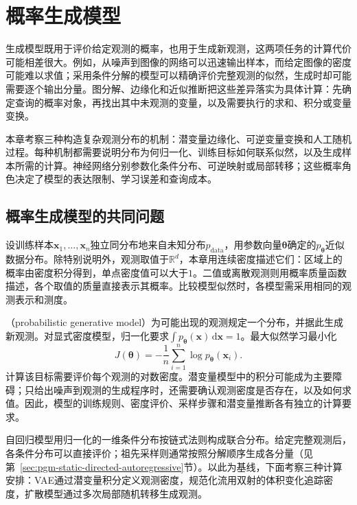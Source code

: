 \chapter{概率生成模型}
\label{chap:pgm-generative}

生成模型既用于评价给定观测的概率，也用于生成新观测，这两项任务的计算代价可能相差很大。例如，从噪声到图像的网络可以迅速输出样本，而给定图像的密度可能难以求值；采用条件分解的模型可以精确评价完整观测的似然，生成时却可能需要逐个输出分量。图分解、边缘化和近似推断把这些差异落实为具体计算：先确定查询的概率对象，再找出其中未观测的变量，以及需要执行的求和、积分或变量变换。

本章考察三种构造复杂观测分布的机制：潜变量边缘化、可逆变量变换和人工随机过程。每种机制都需要说明分布为何归一化、训练目标如何联系似然，以及生成样本所需的计算。神经网络分别参数化条件分布、可逆映射或局部转移；这些概率角色决定了模型的表达限制、学习误差和查询成本。

\section{概率生成模型的共同问题}
\label{sec:pgm-generative-common}

设训练样本$\bm{x}_1,\ldots,\bm{x}_n$独立同分布地来自未知分布$p_{\mathrm{data}}$，用参数向量$\bm{\theta}$确定的$p_{\bm{\theta}}$近似数据分布。除特别说明外，观测取值于$\mathbb{R}^{d}$，本章用连续密度描述它们：区域上的概率由密度积分得到，单点密度值可以大于$1$。二值或离散观测则用概率质量函数描述，各个取值的质量直接表示其概率。比较模型似然时，各模型需采用相同的观测表示和测度。

（probabilistic generative model）为可能出现的观测规定一个分布，并据此生成新观测。对显式密度模型，归一化要求$\int p_{\bm{\theta}}(\bm{x})\,\mathrm{d}\bm{x}=1$。最大似然学习最小化
\begin{equation}
  \label{eq:pgm-generative-nll}
  J(\bm{\theta})
  =-\frac{1}{n}\sum_{i=1}^{n}\log p_{\bm{\theta}}(\bm{x}_i).
\end{equation}
计算该目标需要评价每个观测的对数密度。潜变量模型中的积分可能成为主要障碍；只给出噪声到观测的生成程序时，还需要确认观测密度是否存在，以及如何求值。因此，模型的训练规则、密度评价、采样步骤和潜变量推断各有独立的计算要求。

自回归模型用归一化的一维条件分布按链式法则构成联合分布。给定完整观测后，各条件分布可以直接评价；祖先采样则通常按照分解顺序生成各分量（见第~\ref{sec:pgm-static-directed-autoregressive}节）。以此为基线，下面考察三种计算安排：VAE通过潜变量积分定义观测密度，规范化流用双射的体积变化追踪密度，扩散模型通过多次局部随机转移生成观测。


